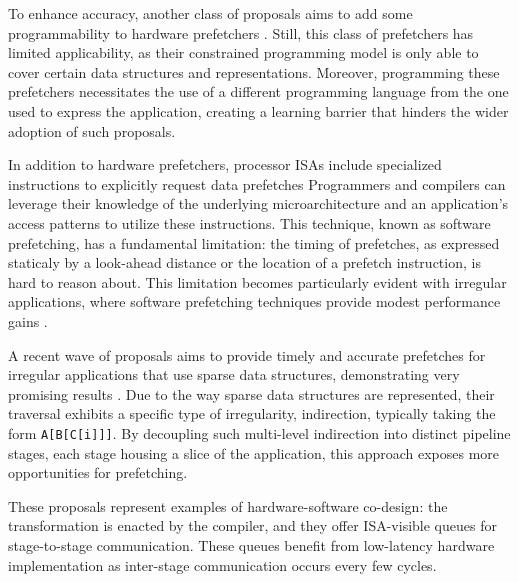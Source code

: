 \documentclass{acaces}
\begin{document}
To enhance accuracy, another class of proposals aims to add some programmability to hardware prefetchers \cite{basak_analysis_2019, talati_prodigy_2021, yang_spzip_2021}.
Still, this class of prefetchers has limited applicability, as their constrained programming model is only able to cover certain data structures and representations.
Moreover, programming these prefetchers necessitates the use of a different programming language from the one used to express the application,
creating a learning barrier that hinders the wider adoption of such proposals.

In addition to hardware prefetchers, processor ISAs include specialized instructions to explicitly request data prefetches
Programmers and compilers can leverage their knowledge of the underlying microarchitecture and an application's access patterns to utilize these instructions.
This technique, known as software prefetching, has a fundamental limitation:
the timing of prefetches, as expressed staticaly by a look-ahead distance or the location of a prefetch instruction, is hard to reason about.
This limitation becomes particularly evident with irregular applications,
where software prefetching techniques provide modest performance gains \cite{tran_clairvoyance_2017, ainsworth_software_2018}.

A recent wave of proposals aims to provide timely and accurate prefetches for irregular applications that use sparse data structures,
demonstrating very promising results \cite{manocha_graphattack_2021, nguyen_phloem_2023}.
Due to the way sparse data structures are represented,
their traversal exhibits a specific type of irregularity, indirection, typically taking the form \texttt{A[B[C[i]]]}.
By decoupling such multi-level indirection into distinct pipeline stages, each stage housing a slice of the application,
this approach exposes more opportunities for prefetching.

These proposals represent examples of hardware-software co-design:
the transformation is enacted by the compiler, and they offer ISA-visible queues for stage-to-stage communication.
These queues benefit from low-latency hardware implementation as inter-stage communication occurs every few cycles.
\end{document}
